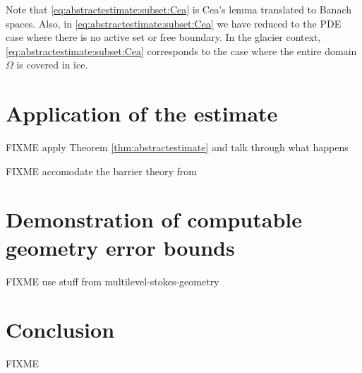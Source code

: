 \documentclass[hidelinks,onefignum,onetabnum,final]{siamart220329}  %
\begin{document}
Note that \eqref{eq:abstractestimate:subset:Cea} is Cea's lemma \cite[Theorem 2.4.1]{Ciarlet2002} translated to Banach spaces.  Also, in \eqref{eq:abstractestimate:subset:Cea} we have reduced to the PDE case where there is no active set or free boundary.  In the glacier context, \eqref{eq:abstractestimate:subset:Cea} corresponds to the case where the entire domain $\Omega$ is covered in ice.


\section{Application of the estimate} \label{sec:application}

FIXME apply Theorem \ref{thm:abstractestimate} and talk through what happens

FIXME accomodate the barrier theory from \cite{Bueler2021conservation}


\section{Demonstration of computable geometry error bounds} \label{sec:demo}

FIXME use stuff from multilevel-stokes-geometry


\section{Conclusion} \label{sec:conclusion}

FIXME




\end{document}

